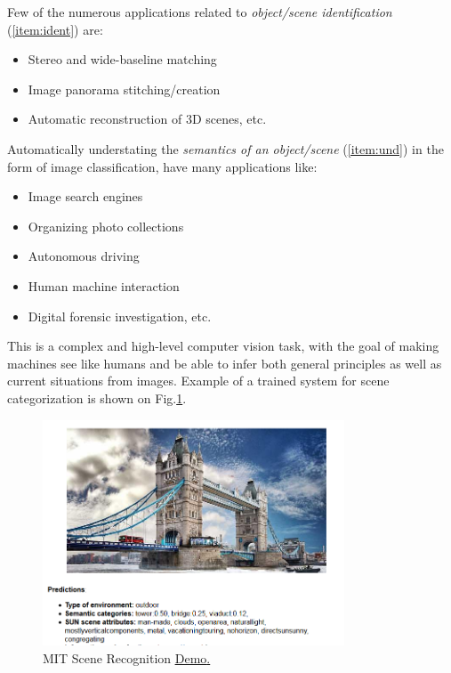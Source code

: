 Few of the numerous applications related to {\em object/scene identification} (\ref{item:ident}) are:
\begin{itemize}
\item Stereo and wide-baseline matching
\item Image panorama stitching/creation
\item Automatic reconstruction of 3D scenes, etc.
\end{itemize}

Automatically understating the {\em semantics of an object/scene} (\ref{item:und}) in the form of image classification, have many applications like:
\begin{itemize}
\item Image search engines
\item Organizing photo collections
\item Autonomous driving
\item Human machine interaction
\item Digital forensic investigation, etc.
\end{itemize}

This is a complex and high-level computer vision task, with the goal of making machines see like humans and be able to infer both general principles as well as current situations from images. Example of a trained system for scene categorization is shown on Fig.\ref{fig:mitdemo}.
\begin{figure}[H]
\begin{center}
\includegraphics[width=0.8\textwidth]{fig/mitdemo}
\end{center}
\caption{ MIT Scene Recognition \href{http://places.csail.mit.edu/demo.html}{\underline{Demo}.}}
\label{fig:mitdemo}
\end{figure}

